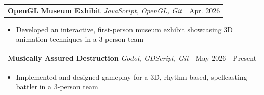 \documentclass[letterpaper,11pt]{article}
\makeatletter
\newcommand{\smallpipe}{\textbf{\raisebox{0.2ex}{\scalebox{1}[0.8]{\textbar}}}}
\newcommand{\resumeItem}[1]{
	\item\small{{#1 \vspace{-2pt}}}
}
\newcommand{\resumeProjectHeading}[3]{
	\item
		\begin{tabular*}{0.97\textwidth}{l@{\extracolsep{\fill}}r}
		\textbf{#1} \smallpipe{} \textit{\small#2} & #3 \\
		\end{tabular*}\vspace{-7pt}
}
\newcommand{\resumeProjectHeadingWebsite}[4]{
	\item
		\begin{tabular*}{0.97\textwidth}{l@{\extracolsep{\fill}}r}
		\textbf{#1} \smallpipe{} \small{\href{#2}{Link}} \smallpipe{} \textit{\small#3} & #4 \\
		\end{tabular*}\vspace{-7pt}
}
\newcommand{\resumeItemListStart}{\begin{itemize}}
\newcommand{\resumeItemListEnd}{\end{itemize}\vspace{-5pt}}
\makeatother
\begin{document}
	\resumeProjectHeading
	{OpenGL Museum Exhibit}
	{JavaScript, OpenGL, Git}
	{Apr. 2026}
	\resumeItemListStart
		\resumeItem{Developed an interactive, first-person museum exhibit showcasing 3D animation techniques in a 3-person team}
	\resumeItemListEnd

	\resumeProjectHeading
	{Musically Assured Destruction}
	{Godot, GDScript, Git}
	{May 2026 - Present}
	\resumeItemListStart
		\resumeItem{Implemented and designed gameplay for a 3D, rhythm-based, spellcasting battler in a 3-person team}
	\resumeItemListEnd




\end{document}
